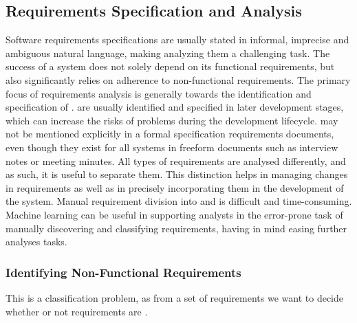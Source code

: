 \subsection{Requirements Specification and Analysis}

Software requirements specifications are usually stated in informal, imprecise
and ambiguous natural language, making analyzing them a challenging task.
The success of a system does not solely depend on its functional requirements,
but also significantly relies on adherence to non-functional requirements.
The primary focus of requirements analysis is generally towards the
identification and specification of \FRs. \NFRs are usually identified and
specified in later development stages, which can increase the risks of problems
during the development lifecycle. \NFRs may not be mentioned explicitly in a
formal specification requirements documents, even though they exist for all
systems in freeform documents such as interview notes or meeting minutes. All
types of requirements are analysed differently, and as such, it is useful to
separate them. This distinction helps in managing changes in requirements as
well as in precisely incorporating them in the development of the system. Manual
requirement division into \FRs and \NFRs is difficult and time-consuming.
Machine learning can be useful in supporting analysts in the error-prone task of
manually discovering and classifying requirements, having in mind easing further
analyses tasks.

\subsubsection{Identifying Non-Functional Requirements}
This is a classification problem, as from a set of requirements we want to
decide whether or not requirements are \NFRs. 

